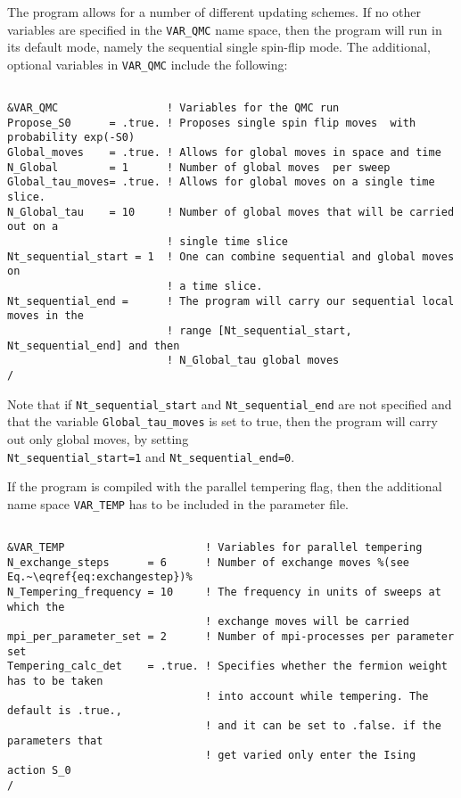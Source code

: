 The program allows for a number of different  updating schemes.  If no other variables are specified in the \texttt{VAR\_QMC} name space, then the program will run in its default mode, namely the sequential single spin-flip mode.   The additional, optional variables in   \texttt{VAR\_QMC}   include the following: 
\lstset{style=fortran}
\begin{lstlisting} 

&VAR_QMC                 ! Variables for the QMC run 
Propose_S0      = .true. ! Proposes single spin flip moves  with probability exp(-S0) 
Global_moves    = .true. ! Allows for global moves in space and time 
N_Global        = 1      ! Number of global moves  per sweep 
Global_tau_moves= .true. ! Allows for global moves on a single time slice.  
N_Global_tau    = 10     ! Number of global moves that will be carried out on a 
                         ! single time slice
Nt_sequential_start = 1  ! One can combine sequential and global moves on 
                         ! a time slice.  
Nt_sequential_end =      ! The program will carry our sequential local moves in the
                         ! range [Nt_sequential_start, Nt_sequential_end] and then
                         ! N_Global_tau global moves
/   
\end{lstlisting}
Note that if \texttt{Nt\_sequential\_start}  and \texttt{Nt\_sequential\_end}  are not specified and that the variable \texttt{Global\_tau\_moves}  is set to true, then  the program will  carry out only global moves, by setting  \\  \texttt{Nt\_sequential\_start=1}  and \texttt{Nt\_sequential\_end=0}. 

If the program is compiled with the parallel tempering flag, then the additional name space \texttt{VAR\_TEMP}   has to be included in the parameter file.
\lstset{style=fortran}
\begin{lstlisting}[escapechar=\%]

&VAR_TEMP                      ! Variables for parallel tempering
N_exchange_steps      = 6      ! Number of exchange moves %(see Eq.~\eqref{eq:exchangestep})%
N_Tempering_frequency = 10     ! The frequency in units of sweeps at which the
                               ! exchange moves will be carried 
mpi_per_parameter_set = 2      ! Number of mpi-processes per parameter set
Tempering_calc_det    = .true. ! Specifies whether the fermion weight has to be taken
                               ! into account while tempering. The default is .true.,
                               ! and it can be set to .false. if the parameters that
                               ! get varied only enter the Ising action S_0
/
\end{lstlisting}

